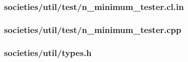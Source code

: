\documentclass{article}
\begin{document}
\subsubsection*{societies/util/test/n\_minimum\_tester.cl.in}


\subsubsection*{societies/util/test/n\_minimum\_tester.cpp}


\subsubsection*{societies/util/types.h}

\end{document}
